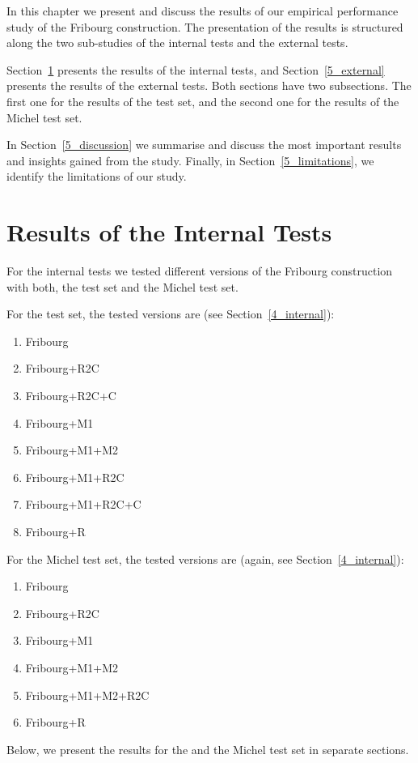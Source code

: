 In this chapter we present and discuss the results of our empirical performance study of the Fribourg construction. The presentation of the results is structured along the two sub-studies of the internal tests and the external tests.

Section~\ref{5_internal} presents the results of the internal tests, and Section~\ref{5_external} presents the results of the external tests. Both sections have two subsections. The first one for the results of the \goal{} test set, and the second one for the results of the Michel test set.

In Section~\ref{5_discussion} we summarise and discuss the most important results and insights gained from the study. Finally, in Section~\ref{5_limitations}, we identify the limitations of our study.


\section{Results of the Internal Tests}
\label{5_internal}
For the internal tests we tested different versions of the Fribourg construction with both, the \goal{} test set and the Michel test set.

For the \goal{} test set, the tested versions are (see Section~\ref{4_internal}):
\begin{enumerate}
\item Fribourg
\item Fribourg+R2C
\item Fribourg+R2C+C
\item Fribourg+M1
\item Fribourg+M1+M2
\item Fribourg+M1+R2C
\item Fribourg+M1+R2C+C
\item Fribourg+R
\end{enumerate}

For the Michel test set, the tested versions are (again, see Section~\ref{4_internal}):
\begin{enumerate}
\item Fribourg
\item Fribourg+R2C
\item Fribourg+M1
\item Fribourg+M1+M2
\item Fribourg+M1+M2+R2C
\item Fribourg+R
\end{enumerate}

Below, we present the results for the \goal{} and the Michel test set in separate sections.

